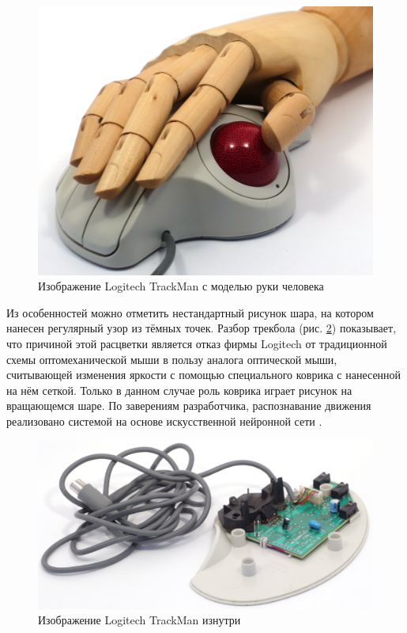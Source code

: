 \documentclass[11pt, a4paper]{article}
\begin{document}
\begin{figure}[h]
    \centering
    \includegraphics[scale=0.4]{1995_logitech_trackman/hand_30.jpg}
    \caption{Изображение Logitech TrackMan с моделью руки человека}
    \label{fig:trackmanHand}
\end{figure}

Из особенностей можно отметить нестандартный рисунок шара, на котором нанесен регулярный узор из тёмных точек. Разбор трекбола (рис. \ref{fig:trackmanInside}) показывает, что причиной этой расцветки является отказ фирмы Logitech от традиционной схемы оптомеханической мыши в пользу аналога оптической мыши, считывающей изменения яркости с помощью специального коврика с нанесенной на нём сеткой. Только в данном случае роль коврика играет рисунок на вращающемся шаре. По заверениям разработчика, распознавание движения реализовано системой на основе искусственной нейронной сети \cite{marbleAdv}.

\begin{figure}[h]
    \centering
    \includegraphics[scale=0.5]{1995_logitech_trackman/inside_30.jpg}
    \caption{Изображение Logitech TrackMan изнутри}
    \label{fig:trackmanInside}
\end{figure}
\end{document}
